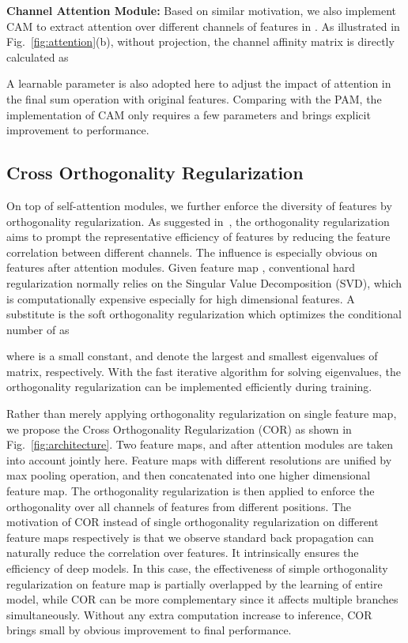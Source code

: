 \documentclass[journal]{IEEEtran}
\begin{document}
\textbf{Channel Attention Module:} Based on similar motivation, we also implement CAM to extract attention over different channels of features in .
As illustrated in Fig.~\ref{fig:attention}(b), without projection, the channel affinity matrix  is directly calculated as

A learnable parameter is also adopted here to adjust the impact of attention in the final sum operation with original features.
Comparing with the PAM, the implementation of CAM only requires a few parameters and brings explicit improvement to performance.

\subsection{Cross Orthogonality Regularization}
On top of self-attention modules, we further enforce the diversity of features by orthogonality regularization.
As suggested in~\cite{chen2019ABD}, the orthogonality regularization aims to prompt the representative efficiency of features by reducing the feature correlation between different channels.
The influence is especially obvious on features after attention modules.
Given feature map , conventional hard regularization normally relies on the Singular Value Decomposition (SVD), which is computationally expensive especially for high dimensional features.
A substitute is the soft orthogonality regularization which optimizes the conditional number of  as

where  is a small constant,  and  denote the largest and smallest eigenvalues of matrix, respectively.
With the fast iterative algorithm for solving eigenvalues, the orthogonality regularization can be implemented efficiently during training.

Rather than merely applying orthogonality regularization on single feature map, we propose the Cross Orthogonality Regularization (COR) as shown in Fig.~\ref{fig:architecture}.
Two feature maps,  and  after attention modules are taken into account jointly here.
Feature maps with different resolutions are unified by max pooling operation, and then concatenated into one higher dimensional feature map.
The orthogonality regularization is then applied to enforce the orthogonality over all channels of features from different positions.
The motivation of COR instead of single orthogonality regularization on different feature maps respectively is that we observe standard back propagation can naturally reduce the correlation over features.
It intrinsically ensures the efficiency of deep models.
In this case, the effectiveness of simple orthogonality regularization on feature map is partially overlapped by the learning of entire model, while COR can be more complementary since it affects multiple branches simultaneously.
Without any extra computation increase to inference, COR brings small by obvious improvement to final performance.
\end{document}
